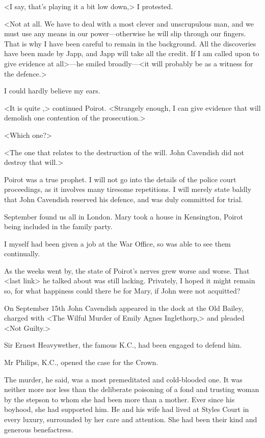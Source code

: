  <I say, that's playing it a bit low down,> I protested. 

 <Not at all. We have to deal with a most clever and unscrupulous man, and we must use any means in our power—otherwise he will slip through our fingers. That is why I have been careful to remain in the background. All the discoveries have been made by Japp, and Japp will take all the credit. If I am called upon to give evidence at all>—he smiled broadly—<it will probably be as a witness for the defence.> 

 I could hardly believe my ears. 

 <It is quite ,> continued Poirot. <Strangely enough, I can give evidence that will demolish one contention of the prosecution.> 

 <Which one?> 

 <The one that relates to the destruction of the will. John Cavendish did not destroy that will.> 

 Poirot was a true prophet. I will not go into the details of the police court proceedings, as it involves many tiresome repetitions. I will merely state baldly that John Cavendish reserved his defence, and was duly committed for trial. 

 September found us all in London. Mary took a house in Kensington, Poirot being included in the family party. 

 I myself had been given a job at the War Office, so was able to see them continually. 

 As the weeks went by, the state of Poirot's nerves grew worse and worse. That <last link> he talked about was still lacking. Privately, I hoped it might remain so, for what happiness could there be for Mary, if John were not acquitted? 

 On September 15th John Cavendish appeared in the dock at the Old Bailey, charged with <The Wilful Murder of Emily Agnes Inglethorp,> and pleaded <Not Guilty.> 

 Sir Ernest Heavywether, the famous K.C., had been engaged to defend him. 

 Mr Philips, K.C., opened the case for the Crown. 

 The murder, he said, was a most premeditated and cold-blooded one. It was neither more nor less than the deliberate poisoning of a fond and trusting woman by the stepson to whom she had been more than a mother. Ever since his boyhood, she had supported him. He and his wife had lived at Styles Court in every luxury, surrounded by her care and attention. She had been their kind and generous benefactress. 

